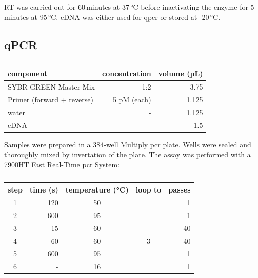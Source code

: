     \ac{RT} was carried out for 60\,minutes at 37\,°C before inactivating the enzyme for 5\,minutes at 95\,°C. \Ac{cDNA} was either used for \ac{qpcr} or stored at -20\,°C.

    \subsection{qPCR}
    \begin{table}[h]
    \capstart
	\centering
	\begin{minipage}{\captionwidth}
	   	\caption[qPCR samples]{}
	   	\label{tab:qPCR_MM}
	\end{minipage}
    \begin{tabular}{|l|r|r|}
        \hline
        component                  & concentration & volume (µL) \\ \hline
        SYBR GREEN Master Mix      & 1:2          & 3.75        \\
        Primer (forward + reverse) & 5 pM (each)  & 1.125       \\
        \ac{water}                        & -            & 1.125       \\
        \ac{cDNA}                       & -            & 1.5           \\ \hline
    \end{tabular}
    \end{table}
    Samples were prepared in a 384-well Multiply \ac{pcr} plate. Wells were sealed and thoroughly mixed by invertation of the plate. The assay was performed with a 7900HT Fast Real-Time \ac{pcr} System:

    \begin{table}[h]
    \capstart
    \centering
    \begin{minipage}{\captionwidth}
        \caption[qPCR programme]{}
        \label{tab:qPCR_programme}
    \end{minipage}
    \begin{tabular}{|c|r|c|c|r|}
    \hline
        step & time (s) & temperature (°C) & loop to & passes \\ \hline
        1    & 120      & 50               &         & 1      \\
        2    & 600      & 95               &         & 1      \\
        3    & 15       & 60               &         & 40     \\
        4    & 60       & 60               & 3       & 40     \\
        5    & 600      & 95               &         & 1      \\
        6    & -        & 16               &         & 1      \\ \hline
    \end{tabular}
    \end{table}

